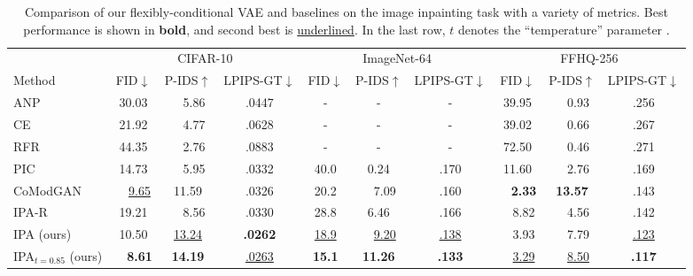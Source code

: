 \begin{table}
  \tiny
  \caption{Comparison of our flexibly-conditional VAE and baselines on the image inpainting task with a variety of metrics. Best performance is shown in \textbf{bold},
    and second best is \underline{underlined}. In the last row, $t$ denotes the
    ``temperature'' parameter \citep{child2020very}.}
  \label{tab:cigcvae-results-completion}
  \centering
  \begin{tabular}{lccccccccc}
    \toprule
    \multicolumn{1}{r}{} & \multicolumn{3}{c}{CIFAR-10}  & \multicolumn{3}{c}{ImageNet-64}  & \multicolumn{3}{c}{FFHQ-256} \\
    \cmidrule(r){2-4} \cmidrule(r){5-7} \cmidrule(r){8-10} %
    Method        & \quad FID$\downarrow$ \quad     & P-IDS$\uparrow$  & LPIPS-GT$\downarrow$ & \quad FID$\downarrow$ \quad    & P-IDS$\uparrow$  & LPIPS-GT$\downarrow$& \quad FID$\downarrow$ \quad    & P-IDS$\uparrow$  & LPIPS-GT$\downarrow$ \\
    \midrule
    ANP                        & 30.03               & ~~5.86              & .0447                         & -                 & -                 & -                & 39.95              & ~~0.93              & .256 \\
    CE                         & 21.92               & ~~4.77              & .0628                         & -                 & -                 & -                & 39.02              & ~~0.66              & .267 \\
    RFR                        & 44.35               & ~~2.76              & .0883                         & -                 & -                   & -              & 72.50              & ~~0.46              & .271 \\
    PIC                        & 14.73               & ~~5.95              & .0332                         & 40.0              & 0.24                & .170           & 11.60              & ~~2.76              & .169 \\
    CoModGAN                   & ~~\underline{9.65}  & 11.59               & .0326                         & 20.2              & ~~7.09              & .160           & ~~\textbf{2.33}    & \textbf{13.57}      & .143 \\
    IPA-R                      & 19.21               & ~~8.56              & .0330                         & 28.8              & 6.46                & .166           & ~~8.82             & ~~4.56              & .142 \\
    IPA (ours)                 & 10.50               & \underline{13.24}   & \textbf{.0262}                & \underline{18.9}  & ~~\underline{9.20}  & \underline{.138}  & ~~3.93             & ~~7.79              & \underline{.123} \\
    IPA$_{t=0.85}$ (ours)      & ~~\textbf{8.61}     & \textbf{14.19}      & \underline{.0263}             & \textbf{15.1}     & \textbf{11.26}    & \textbf{.133}     & ~~\underline{3.29} & ~~\underline{8.50}  & \textbf{.117} \\
    \bottomrule
  \end{tabular}
  \vspace{-1em}
\end{table}


